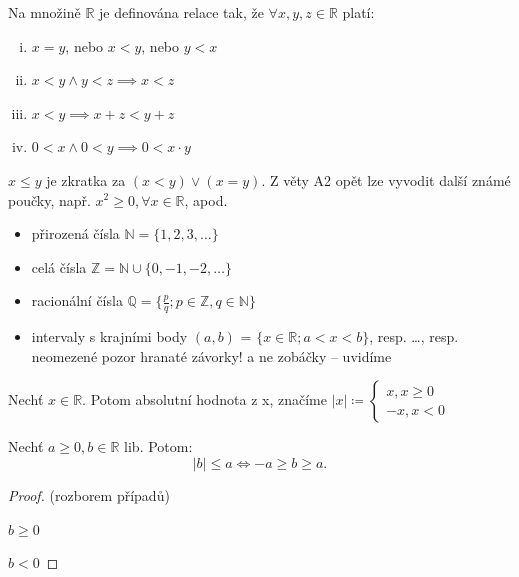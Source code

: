 \begin{axiom}
  Na množině $\mathbb{R}$ je definována relace \uv{$<$} tak, že $\forall x, y, z \in \mathbb{R}$ platí:
  \begin{enumerate}[i.]
    \item $x = y$, nebo $x < y$, nebo $y < x$
    \item $x < y \land y < z \implies x < z$
    \item $x < y \implies x + z < y + z$
    \item $0 < x \land 0 < y \implies 0 < x \cdot y$
  \end{enumerate}
\end{axiom}

\begin{poznamka}
  $x \leq y$ je zkratka za $(x < y) \lor (x = y)$. Z věty A2 opět lze vyvodit další známé poučky, např. $x^2 \geq 0, \forall x \in \mathbb R$, apod.
\end{poznamka}

\begin{poznamka}
  \begin{itemize}
    \item přirozená čísla $\mathbb N = \{1, 2, 3, \dots\}$
    \item celá čísla $\mathbb Z = \mathbb N \cup \{0, -1, -2, \dots\}$
    \item racionální čísla $\mathbb Q = \{\frac{p}{q}; p \in \mathbb Z, q \in \mathbb N\}$
    \item intervaly s krajními body $(a, b)$ = $\{x \in \mathbb R; a < x < b\}$, resp. \dots, resp. neomezené pozor hranaté závorky! a ne zobáčky -- uvidíme
  \end{itemize}
\end{poznamka}

\begin{definice}
  Nechť $x \in \mathbb R$. Potom absolutní hodnota z x, značíme $|x| \coloneq \begin{cases}x, x \geq 0 \\ -x, x < 0\end{cases}$
\end{definice}

\begin{lemma}
  Nechť $a \geq 0, b \in \mathbb R$ lib. Potom:
  $$ |b| \leq a \iff -a \geq b \geq a.$$
\end{lemma}

\begin{proof}
  (rozborem případů)
  \item $b \geq 0$
  \item $b < 0$
\end{proof}

